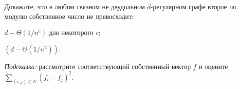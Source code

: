 Докажите, что в любом связном не двудольном $d$-регулярном графе второе по модулю собственное число не превосходит:
\begin{enumcyr}
    \item $d - \Theta(1 / n^c)$ для некоторого $c$;
    \item $(d - \Theta(1 / n^2))$.
\end{enumcyr}

\textit{Подсказка:} рассмотрите соответствующий собственный вектор $f$ и оцените $\sum\limits_{(i, j) \in E} (f_i - f_j)^2$.